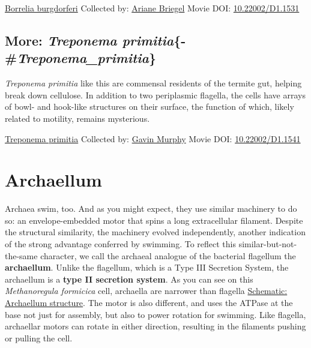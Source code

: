 \documentclass[]{tufte-book}
\begin{document}
\hypertarget{htmlwidget-45bb520104a21859a20c}{}

\label{fig:6-7}\protect\hyperlink{tree}{Borrelia burgdorferi} Collected by: \protect\hyperlink{ariane_briegel}{Ariane Briegel} Movie DOI: \href{https://doi.org/10.22002/D1.1531}{10.22002/D1.1531}

\hypertarget{more-treponema-primitia-treponema_primitia}{%
\subsection{\texorpdfstring{More: \emph{Treponema primitia}\{-\#\emph{Treponema\_primitia}\}}{More: Treponema primitia\{-\#Treponema\_primitia\}}}\label{more-treponema-primitia-treponema_primitia}}

\emph{Treponema primitia} like this are commensal residents of the termite gut, helping break down cellulose. In addition to two periplasmic flagella, the cells have arrays of bowl- and hook-like structures on their surface, the function of which, likely related to motility, remains mysterious.



\hypertarget{htmlwidget-b25ed28229267db4f432}{}

\label{fig:6-7a}\protect\hyperlink{tree}{Treponema primitia} Collected by: \protect\hyperlink{gavin_murphy}{Gavin Murphy} Movie DOI: \href{https://doi.org/10.22002/D1.1541}{10.22002/D1.1541}

\hypertarget{archaellum}{%
\section{Archaellum}\label{archaellum}}

Archaea swim, too. And as you might expect, they use similar machinery to do so: an envelope-embedded motor that spins a long extracellular filament. Despite the structural similarity, the machinery evolved independently, another indication of the strong advantage conferred by swimming. To reflect this similar-but-not-the-same character, we call the archaeal analogue of the bacterial flagellum the \textbf{archaellum}. Unlike the flagellum, which is a Type III Secretion System, the archaellum is a \textbf{type II secretion system}. As you can see on this \emph{Methanoregula formicica} cell, archaella are narrower than flagella \protect\hyperlink{Archaellum_structure}{Schematic: Archaellum structure}. The motor is also different, and uses the ATPase at the base not just for assembly, but also to power rotation for swimming. Like flagella, archaellar motors can rotate in either direction, resulting in the filaments pushing or pulling the cell.
\end{document}
